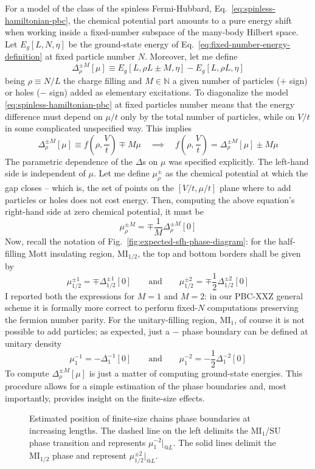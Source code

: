 For a model of the class of the spinless Fermi-Hubbard, Eq.~\eqref{eq:spinless-hamiltonian-pbc}, the chemical potential part amounts to a pure energy shift when working inside a fixed-number subspace of the many-body Hilbert space. Let $E_g[L,N,\eta]$ be the ground-state energy of Eq.~\eqref{eq:fixed-number-energy-definition} at fixed particle number $N$. Moreover, let me define
\[
	\Delta_\rho^{\pm M}[\mu] \equiv E_g[L, \rho L \pm M, \eta] - E_g[L, \rho L, \eta]
\]
being $\rho \equiv N/L$ the charge filling and $M \in \mathbb{N}$ a given number of particles ($+$ sign) or holes ($-$ sign) added as elementary excitations. To diagonalize the model \eqref{eq:spinless-hamiltonian-pbc} at fixed particles number means that the energy difference must depend on $\mu/t$ only by the total number of particles, while on $V/t$ in some complicated unspecified way. This implies
\[
	\Delta_\rho^{\pm M}[\mu] \equiv f\left(
		\rho, \frac{V}{t} 
	\right) \mp M \mu
	\quad\implies\quad
	f\left(
		\rho, \frac{V}{t} 
	\right) = \Delta_\rho^{\pm M}[\mu] \pm M\mu
\]
The parametric dependence of the $\Delta$s on $\mu$ was specified explicitly. The left-hand side is independent of $\mu$. Let me define $\mu_\rho^\pm$ as the chemical potential at which the gap closes -- which is, the set of points on the $[V/t,\mu/t]$ plane where to add particles or holes does not cost energy. Then, computing the above equation's right-hand side at zero chemical potential, it must be
\[
	\mu_\rho^{\pm M} = \mp \frac{1}{M} \Delta_\rho^{\pm M}[0]
\]
Now, recall the notation of Fig.~\ref{fig:expected-sfh-phase-diagram}: for the half-filling Mott insulating region, $\mathrm{MI}_{1/2}$, the top and bottom borders shall be given by
\[
	\mu_{1/2}^{\pm 1} = \mp \Delta_{1/2}^{\pm 1}[0]
	\qquad\text{and}\qquad
	\mu_{1/2}^{\pm 2} = \mp \frac{1}{2} \Delta_{1/2}^{\pm 2}[0]
\]
I reported both the expressions for $M=1$ and $M=2$: in our PBC-$\mathrm{XXZ}$ general scheme it is formally more correct to perform fixed-$N$ computations preserving the fermion number parity. For the unitary-filling region, $\mathrm{MI}_1$, of course it is not possible to add particles; as expected, just a $-$ phase boundary can be defined at unitary density
\[
	\mu_1^{-1} = -\Delta_1^{-1}[0]
	\qquad\text{and}\qquad
	\mu_1^{-2} = -\frac{1}{2} \Delta_1^{-2}[0]
\]
To compute $\Delta_\rho^{\pm M}[\mu]$ is just a matter of computing ground-state energies. This procedure allows for a simple estimation of the phase boundaries and, most importantly, provides insight on the finite-size effects.

\begin{figure}
	\centering
	
	\caption{Estimated position of finite-size chains phase boundaries at increasing lengths. The dashed line on the left delimits the $\mathrm{MI}_1$/$\mathrm{SU}$ phase transition and represents $\mu_1^{-2} |_{@L}$. The solid lines delimit the $\mathrm{MI}_{1/2}$ phase and represent $\mu_{1/2}^{\pm2} |_{@L}$.}
	\label{fig:phase-boundaries}
\end{figure}

